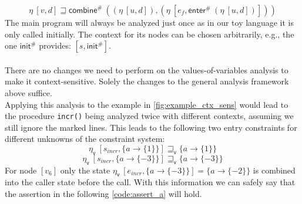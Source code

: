     \[\eta\ [v, d] \sqsupseteq \textsf{combine}^{\#}\ ((\eta\ [u, d]), (\eta\ [e_f, \textsf{enter}^{\#}\ (\eta\ [u, d])])) \]
    The main program will always be analyzed just once as in our toy language it is only called initially. The context for its nodes can be chosen arbitrarily, e.g., the one $\textsf{init}^{\#}$ provides: $[s, \textsf{init}^{\#}]$.\\
    \\
    There are no changes we need to perform on the values-of-variables analysis to make it context-sensitive. Solely the changes to the general analysis framework above suffice.\\ Applying this analysis to the example in \autoref{fig:example_ctx_sens} would lead to the procedure \texttt{incr()} being analyzed twice with different contexts, assuming we still ignore the marked lines. This leads to the following two entry constraints for different unknowns of the constraint system:
    \[\eta_\textsf{v}\ [s_{incr}, \{a \rightarrow \{1\} \}] \sqsupseteq_\textsf{v} \{a \rightarrow \{1\} \} \]
    \[\eta_\textsf{v}\ [s_{incr}, \{a \rightarrow \{-3\} \}] \sqsupseteq_\textsf{v} \{a \rightarrow \{-3\} \} \]
    For node $[v_6]$ only the state $\eta_\textsf{v}\ [e_{incr}, \{a \rightarrow \{-3\} \}] = \{a \rightarrow \{-2\}\}$ is combined into the caller state before the call. With this information we can safely say that the assertion in the following \autoref{code:assert_a} will hold.

